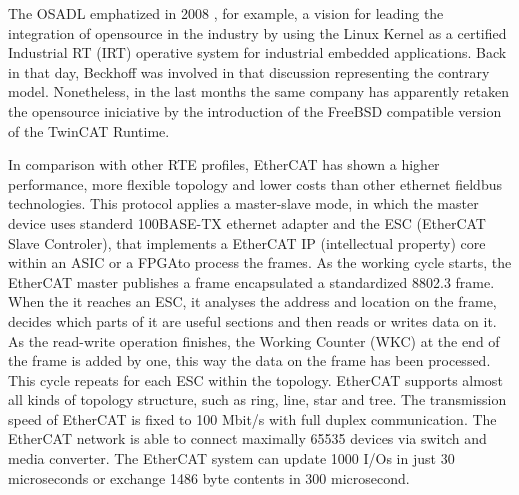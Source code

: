 The OSADL emphatized in 2008 \cite{beckhoff_vs_osadl}, for example, a vision for leading the integration
of opensource in the industry by using the Linux Kernel as a certified Industrial RT (IRT) operative system for industrial embedded applications. 
Back in that day, Beckhoff was involved in that discussion representing the contrary model. Nonetheless, in the last months the same company has
apparently retaken the opensource iniciative by the introduction of the FreeBSD compatible version of the TwinCAT Runtime\cite{beckhoff_freebsd}.%

In comparison with other RTE profiles, EtherCAT has shown a higher performance, more flexible topology and lower costs than other ethernet fieldbus 
technologies. This  protocol  applies  a  master-slave  mode,  in  which  the  master  
device  uses  standerd  100BASE-TX  ethernet  adapter  and  the  ESC  (EtherCAT  Slave  Controler), that implements a EtherCAT IP 
(intellectual property) core within an ASIC or a FPGAto process the frames. As  the  working  cycle starts, the  EtherCAT master  
publishes a frame encapsulated a standardized 8802.3 frame. When the it reaches an ESC, it analyses the address and location on the frame, decides
which parts of it are useful sections and then reads or writes data on it. As the
read-write operation finishes, the Working Counter (WKC) at the end of the frame is added by one, this way the data on the frame has been processed. 
This cycle repeats for each ESC within the topology.%
EtherCAT supports almost all kinds of topology structure, such as ring, line, star and tree. The transmission speed of  EtherCAT  is  fixed  to  100  
Mbit/s  with  full  duplex  communication.  The  EtherCAT  network  is  able  to  connect  maximally 65535  devices  via  switch  and  media  converter.  
The  EtherCAT  system  can  update  1000  I/Os  in  just  30  microseconds  or  exchange  1486  byte  contents  in  300  microsecond. \cite{beckhoff_datasheet}\cite{ecat_sercos}  %

